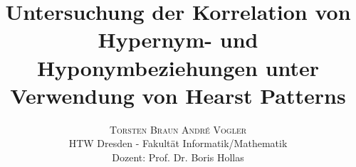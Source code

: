 \documentclass[twoside]{article}
\title{\vspace{-15mm}\fontsize{20pt}{10pt}\selectfont\textbf{Untersuchung der Korrelation von Hypernym- und
  Hyponymbeziehungen unter Verwendung von Hearst Patterns}}
\author{
\large
\textsc{Torsten Braun \qquad Andr\'{e} Vogler}\\[2mm]
\normalsize HTW Dresden - Fakultät Informatik/Mathematik \\
\normalsize Dozent: Prof. Dr. Boris Hollas
\vspace{-5mm}
}
\date{}
\begin{document}
  \maketitle
  \thispagestyle{fancy}

  

  \begin{multicols}{2}
    
    \newpage
    
  \end{multicols}
\end{document}
